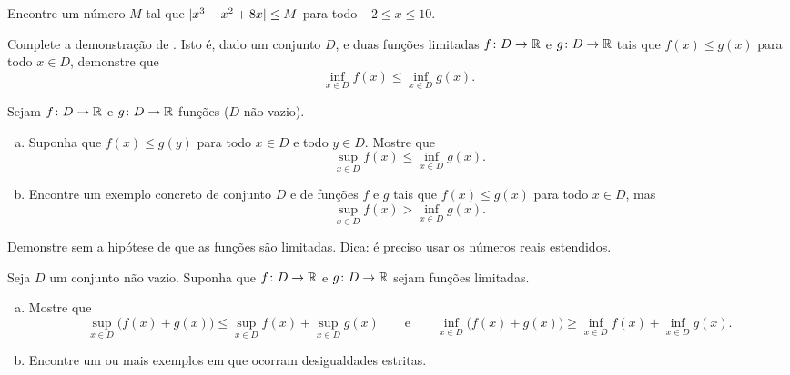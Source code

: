 \begin{exercise}
Encontre um número $M$ tal que $\lvert {x^3-x^2+8x} \rvert \leq M$ para todo $-2 \leq x \leq
10$.
\end{exercise}

\begin{exercise} \label{exercise:finishfuncsupinf}
Complete a demonstração de .
Isto é,
dado um conjunto $D$,
e duas funções limitadas
$f \colon D \to {\mathbb{R}}$ e $g \colon D \to {\mathbb{R}}$
tais que $f(x) \leq g(x)$ para todo $x \in D$, demonstre que
\begin{equation*}
\inf_{x\in D} f(x) \leq \inf_{x\in D} g(x) .
\end{equation*}
\end{exercise}

\begin{exercise} \label{exercise:supinffuncineq}
Sejam
$f \colon D \to {\mathbb{R}}$ e $g \colon D \to {\mathbb{R}}$ funções ($D$ não vazio).
\begin{enumerate}[a)]
%
\item
Suponha que
$f(x) \leq g(y)$ para todo $x \in D$ e todo $y \in D$. Mostre que
\begin{equation*}
\sup_{x\in D} f(x) \leq \inf_{x\in D} g(x) .
\end{equation*}
%
\item
Encontre um exemplo concreto de conjunto $D$ e de funções $f$ e $g$ tais que
$f(x) \leq g(x)$ para todo $x \in D$, mas
\begin{equation*}
\sup_{x\in D} f(x) > \inf_{x\in D} g(x) .
\end{equation*}
\end{enumerate}
\end{exercise}

\begin{exercise}
Demonstre  sem a hipótese de que
as funções são limitadas. Dica: é preciso usar os números reais
estendidos.
\end{exercise}

\begin{exercise} \label{exercise:sumofsup}
\pagebreak[2]
Seja $D$ um conjunto não vazio.
Suponha que $f \colon D \to {\mathbb{R}}$ e $g \colon D \to {\mathbb{R}}$ sejam funções limitadas.
\begin{enumerate}[a)]
\item
Mostre que
\begin{equation*}
\sup_{x\in D} \bigl(f(x) + g(x) \bigr) \leq
\sup_{x\in D} f(x)
+
\sup_{x\in D} g(x)
\qquad \text{e}
\qquad
\inf_{x\in D} \bigl(f(x) + g(x) \bigr) \geq
\inf_{x\in D} f(x)
+
\inf_{x\in D} g(x) .
\end{equation*}
\item
Encontre um ou mais exemplos em que ocorram desigualdades estritas.
\end{enumerate}
\end{exercise}

